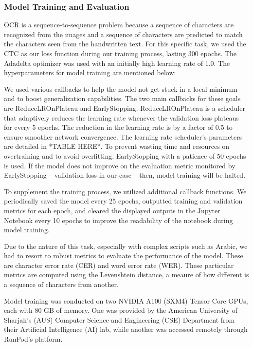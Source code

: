 \documentclass[conference]{IEEEtran}
\begin{document}
\subsubsection{Model Training and Evaluation}

OCR is a sequence-to-sequence problem because a sequence of characters are recognized from the images and a sequence of characters are predicted to match the characters seen from the handwritten text. For this specific task, we used the CTC as our loss function during our training process, lasting 300 epochs. The Adadelta optimizer was used with an initially high learning rate of 1.0. The hyperparameters for model training are mentioned below:

We used various callbacks to help the model not get stuck in a local minimum and to boost generalization capabilities. The two main callbacks for these goals are ReduceLROnPlateau and EarlyStopping. ReduceLROnPlateau is a scheduler that adaptively reduces the learning rate whenever the validation loss plateaus for every 5 epochs. The reduction in the learning rate is by a factor of 0.5 to ensure smoother network convergence. The learning rate scheduler's parameters are detailed in *TABLE HERE*. To prevent wasting time and resources on overtraining and to avoid overfitting, EarlyStopping with a patience of 50 epochs is used. If the model does not improve on the evaluation metric monitored by EarlyStopping -- validation loss in our case -- then, model training will be halted.

To supplement the training process, we utilized additional callback functions. We periodically saved the model every 25 epochs, outputted training and validation metrics for each epoch, and cleared the displayed outputs in the Jupyter Notebook every 10 epochs to improve the readability of the notebook during model training.

Due to the nature of this task, especially with complex scripts such as Arabic, we had to resort to robust metrics to evaluate the performance of the model. These are character error rate (CER) and word error rate (WER). These particular metrics are computed using the Levenshtein distance, a meaure of how different is a sequence of characters from another.


Model training was conducted on two NVIDIA A100 (SXM4) Tensor Core GPUs, each with 80 GB of memory. One was provided by the American University of Sharjah's (AUS) Computer Science and Engineering (CSE) Department from their Artificial Intelligence (AI) lab, while another was accessed remotely through RunPod's platform.
\end{document}
